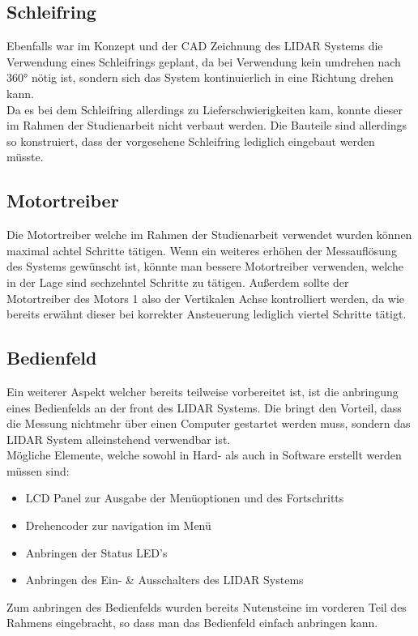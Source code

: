 \subsection{Schleifring}
Ebenfalls war im Konzept und der \ac{CAD} Zeichnung des \ac{LIDAR} Systems die Verwendung eines Schleifrings geplant, da bei Verwendung kein umdrehen nach 360° nötig ist, sondern sich das System kontinuierlich in eine Richtung drehen kann.\\
Da es bei dem Schleifring allerdings zu Lieferschwierigkeiten kam, konnte dieser im Rahmen der Studienarbeit nicht verbaut werden. Die Bauteile sind allerdings so konstruiert, dass der vorgesehene Schleifring lediglich eingebaut werden müsste. 
\subsection{Motortreiber}
Die Motortreiber welche im Rahmen der Studienarbeit verwendet wurden können maximal achtel Schritte tätigen. Wenn ein weiteres erhöhen der Messauflösung des Systems gewünscht ist, könnte man bessere Motortreiber verwenden, welche in der Lage sind sechzehntel Schritte zu tätigen. Außerdem sollte der Motortreiber des Motors 1 also der Vertikalen Achse kontrolliert werden, da wie bereits erwähnt dieser bei korrekter Ansteuerung lediglich viertel Schritte tätigt. 
\subsection{Bedienfeld}
Ein weiterer Aspekt welcher bereits teilweise vorbereitet ist, ist die anbringung eines Bedienfelds an der front des \ac{LIDAR} Systems. Die bringt den Vorteil, dass die Messung nichtmehr über einen Computer gestartet werden muss, sondern das \ac{LIDAR} System alleinstehend verwendbar ist.\\
Mögliche Elemente, welche sowohl in Hard- als auch in Software erstellt werden müssen sind:
\begin{itemize}
	\item LCD Panel zur Ausgabe der Menüoptionen und des Fortschritts
	\item Drehencoder zur navigation im Menü
	\item Anbringen der Status LED's
	\item Anbringen des Ein- \& Ausschalters des \ac{LIDAR} Systems
\end{itemize}
Zum anbringen des Bedienfelds wurden bereits Nutensteine im vorderen Teil des Rahmens eingebracht, so dass man das Bedienfeld einfach anbringen kann.  


